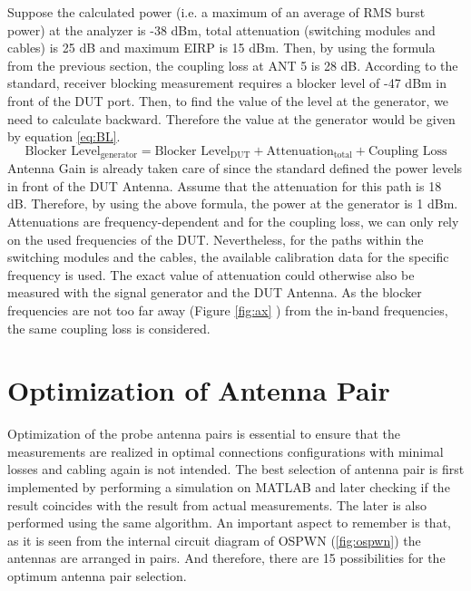 Suppose the calculated power (i.e. a maximum of an average of \acs{RMS} burst power) at the analyzer is -38 dBm, total attenuation (switching modules and cables) is 25 dB and maximum \acs{EIRP} is 15 dBm. Then, by using the formula from the previous section, the coupling loss at ANT 5 is 28 dB. According to the standard, receiver blocking measurement requires a blocker level of -47 dBm in front of the \acs{DUT} port. Then, to find the value of the level at the generator, we need to calculate backward. Therefore the value at the generator would be given by equation \ref{eq:BL}.
\begin{equation}
\mbox{Blocker Level}_{\mbox{generator}}  = \mbox{Blocker Level}_{\mbox{DUT}} + \mbox{Attenuation}_{\mbox{total}} + \mbox{Coupling Loss} \label{eq:BL}
\end{equation}
Antenna Gain is already taken care of since the standard defined the power levels in front of the \acs{DUT} Antenna. Assume that the attenuation for this path is 18 dB. Therefore, by using the above formula, the power at the generator is 1 dBm. Attenuations are frequency-dependent and for the coupling loss, we can only rely on the used frequencies of the \acs{DUT}. Nevertheless, for the paths within the switching modules and the cables, the available calibration data for the specific frequency is used. The exact value of attenuation could otherwise also be measured with the signal generator and the \acs{DUT} Antenna. As the blocker frequencies are not too far away (Figure \ref{fig:ax} ) from the in-band frequencies, the same coupling loss is considered.

\section{Optimization of Antenna Pair} \label{sec:opti}
Optimization of the probe antenna pairs is essential to ensure that the measurements are realized in optimal connections configurations with minimal losses and cabling again is not intended. The best selection of antenna pair is first implemented by performing a simulation on MATLAB\textregistered{} and later checking if the result coincides with the result from actual measurements. The later is also performed using the same algorithm. An important aspect to remember is that, as it is seen from the internal circuit diagram of OSPWN (\ref{fig:ospwn}) the antennas are arranged in pairs. And therefore, there are 15 possibilities for the optimum antenna pair selection.

